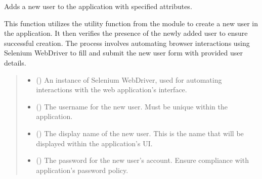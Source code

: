 \documentclass[letterpaper,10pt,english]{sphinxmanual}
\begin{document}
\begin{fulllineitems}
\label{\detokenize{tests:tests.test_create_user.add_user}}
\pysigstartsignatures
{}
\pysigstopsignatures
\sphinxAtStartPar
Adds a new user to the application with specified attributes.

\sphinxAtStartPar
This function utilizes the  utility function from the
 module to create a new user in the application. It then verifies
the presence of the newly added user to ensure successful creation. The process involves automating browser
interactions using Selenium WebDriver to fill and submit the new user form with provided user details.
\begin{quote}\begin{description}
\begin{itemize}
\item {} 
\sphinxAtStartPar
{} () \textendash{} An instance of Selenium WebDriver, used for automating interactions with the web
application’s interface.

\item {} 
\sphinxAtStartPar
{} () \textendash{} The username for the new user. Must be unique within the application.

\item {} 
\sphinxAtStartPar
{} () \textendash{} The display name of the new user. This is the name that will be displayed within the
application’s UI.

\item {} 
\sphinxAtStartPar
{} () \textendash{} The password for the new user’s account. Ensure compliance with application’s password
policy.


\end{itemize}
\end{description}
\end{quote}
\end{fulllineitems}
\end{document}
